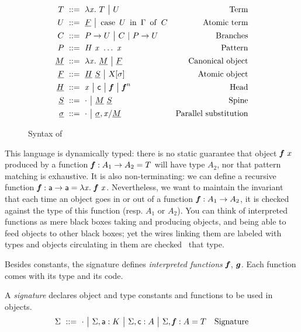 \documentclass{llncs}
\begin{document}
\begin{figure}
  \centering
  \begin{align*}
    T &\ ::=\  \lambda{\ensuremath{\text{\textit{x}}}}.\  T \ {\big|}\ 
    U & \text{Term} \\
    U &\ ::=\  {\underline{F}} \ {\big|}\ 
    \operatorname{case}\ {{U}\ \operatorname{in}\ {\Gamma}}\ \operatorname{of}\  C & \text{Atomic term}\\
    C &\ ::=\  {P}\to U \ {\big|}\ 
    C\ |\ {P}\to U & \text{Branches}\\
    P &\ ::=\  {H}\  {\text{\textit{x}}}\ \ldots\ {\text{\textit{x}}} &\text{Pattern} \\
    \underline{M} &\ ::=\  \lambda{\ensuremath{\text{\textit{x}}}}.\  {\underline{M}} \ {\big|}\  \underline{F} &
    \text{Canonical object} \\
    \underline{F} &\ ::=\  {\underline{H}}\  {\underline{S}} \ {\big|}\  {\text{\textsl{X}}}[{\sigma}] &
    \text{Atomic object} \\
    \underline{H} &\ ::=\  \text{\textit{x}} \ {\big|}\  \text{\textsf{c}} \ {\big|}\  \text{\textit{\textbf{f}}} \ {\big|}\  \text{\textit{\textbf{f}}}^{n}&
    \text{Head}\\
    \underline{S} &\ ::=\  \cdot \ {\big|}\  {\underline{M}}\ {\underline{S}} &
    \text{Spine}\\
    \underline{\sigma} &\ ::=\  \cdot \ {\big|}\  {\underline{\sigma}},{{\text{\textit{x}}}/{\underline{M}}} &
    \text{Parallel substitution} \\
  \end{align*}
  
  \caption{Syntax of \CL}
\label{fig:syntax-CL}
\end{figure}

This language is dynamically typed: there is no static guarantee that
object ${\text{\textit{\textbf{f}}}}\  x$ produced by a function $\text{\textit{\textbf{f}}} : A_1\to A_2 =
T$ will have type $A_2$, nor that pattern matching is exhaustive. It
is also non-terminating: we can define a recursive function $\text{\textit{\textbf{f}}} :
\text{\textsf{a}}\to \text{\textsf{a}} = \lambda{\ensuremath{\text{\textit{x}}}}.\  {\text{\textit{\textbf{f}}}}\  {\text{\textit{x}}}$. Nevertheless, we
want to maintain the invariant that each time an object goes in or out
of a function $\text{\textit{\textbf{f}}} : A_1\to A_2$, it is checked against the type of
this function (resp. $A_1$ or $A_2$). You can think of interpreted
functions as mere black boxes taking and producing objects, and being
able to feed objects to other black boxes; yet the wires linking them
are labeled with types and objects circulating in them are checked
\wrt\ that type.

Besides constants, the signature defines \emph{interpreted functions}
$\text{\textit{\textbf{f}}}$, $\text{\textit{\textbf{g}}}$. Each function comes with its type and its
code. 

\begin{definition}
  A \emph{signature} declares object and type constants and functions
  to be used in objects.
  \begin{align*}
    \Sigma &\ ::=\ 
    \cdot
    \ {\big|}\ 
    {\Sigma},{\text{\textsf{a}} : K}
    \ {\big|}\ 
    {\Sigma},{\text{\textsf{c}} : A}
    \ {\big|}\ 
    {\Sigma},{\text{\textit{\textbf{f}}} : A = T}
    &\text{Signature}
  \end{align*}
\end{definition}
\end{document}
